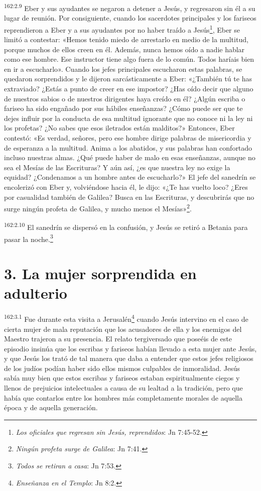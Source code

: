 \par
\textsuperscript{162:2.9} Eber y sus ayudantes se negaron a detener a Jesús, y regresaron sin él a su lugar de reunión. Por consiguiente, cuando los sacerdotes principales y los fariseos reprendieron a Eber y a sus ayudantes por no haber traído a Jesús\footnote{\textit{Los oficiales que regresan sin Jesús, reprendidos}: Jn 7:45-52.}, Eber se limitó a contestar: «Hemos tenido miedo de arrestarlo en medio de la multitud, porque muchos de ellos creen en él. Además, nunca hemos oído a nadie hablar como ese hombre. Ese instructor tiene algo fuera de lo común. Todos haríais bien en ir a escucharlo». Cuando los jefes principales escucharon estas palabras, se quedaron sorprendidos y le dijeron sarcásticamente a Eber: «¿También tú te has extraviado? ¿Estás a punto de creer en ese impostor? ¿Has oído decir que alguno de nuestros sabios o de nuestros dirigentes haya creído en él? ¿Algún escriba o fariseo ha sido engañado por sus hábiles enseñanzas? ¿Cómo puede ser que te dejes influir por la conducta de esa multitud ignorante que no conoce ni la ley ni los profetas? ¿No sabes que esos iletrados están malditos?» Entonces, Eber contestó: «Es verdad, señores, pero ese hombre dirige palabras de misericordia y de esperanza a la multitud. Anima a los abatidos, y sus palabras han confortado incluso nuestras almas. ¿Qué puede haber de malo en esas enseñanzas, aunque no sea el Mesías de las Escrituras? Y aún así, ¿es que nuestra ley no exige la equidad? ¿Condenamos a un hombre antes de escucharlo?» El jefe del sanedrín se encolerizó con Eber y, volviéndose hacia él, le dijo: «¿Te has vuelto loco? ¿Eres por casualidad también de Galilea? Busca en las Escrituras, y descubrirás que no surge ningún profeta de Galilea, y mucho menos el Mesías»\footnote{\textit{Ningún profeta surge de Galilea}: Jn 7:41.}.

\par
\textsuperscript{162:2.10} El sanedrín se dispersó en la confusión, y Jesús se retiró a Betania para pasar la noche.\footnote{\textit{Todos se retiran a casa}: Jn 7:53.}

\section*{3. La mujer sorprendida en adulterio}
\par
\textsuperscript{162:3.1} Fue durante esta visita a Jerusalén\footnote{\textit{Enseñanza en el Templo}: Jn 8:2.} cuando Jesús intervino en el caso de cierta mujer de mala reputación que los acusadores de ella y los enemigos del Maestro trajeron a su presencia. El relato tergiversado que poseéis de este episodio insinúa que los escribas y fariseos habían llevado a esta mujer ante Jesús, y que Jesús los trató de tal manera que daba a entender que estos jefes religiosos de los judíos podían haber sido ellos mismos culpables de inmoralidad. Jesús sabía muy bien que estos escribas y fariseos estaban espiritualmente ciegos y llenos de prejuicios intelectuales a causa de su lealtad a la tradición, pero que había que contarlos entre los hombres más completamente morales de aquella época y de aquella generación.

